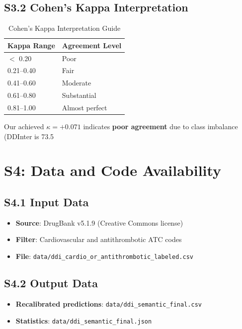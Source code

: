 \documentclass[11pt,a4paper]{article}
\begin{document}
\subsection{S3.2 Cohen's Kappa Interpretation}

\begin{table}[h]
\centering
\caption{Cohen's Kappa Interpretation Guide}
\begin{tabular}{ll}
\toprule
\textbf{Kappa Range} & \textbf{Agreement Level} \\
\midrule
$<$ 0.20 & Poor \\
0.21--0.40 & Fair \\
0.41--0.60 & Moderate \\
0.61--0.80 & Substantial \\
0.81--1.00 & Almost perfect \\
\bottomrule
\end{tabular}
\end{table}

Our achieved $\kappa = +0.071$ indicates \textbf{poor agreement} due to class imbalance (DDInter is 73.5%

\newpage
\section{S4: Data and Code Availability}

\subsection{S4.1 Input Data}
\begin{itemize}
    \item \textbf{Source}: DrugBank v5.1.9 (Creative Commons license)
    \item \textbf{Filter}: Cardiovascular and antithrombotic ATC codes
    \item \textbf{File}: \texttt{data/ddi\_cardio\_or\_antithrombotic\_labeled.csv}
\end{itemize}

\subsection{S4.2 Output Data}
\begin{itemize}
    \item \textbf{Recalibrated predictions}: \texttt{data/ddi\_semantic\_final.csv}
    \item \textbf{Statistics}: \texttt{data/ddi\_semantic\_final.json}
\end{itemize}
\end{document}
